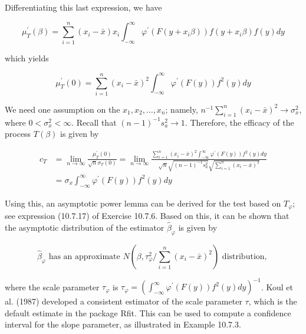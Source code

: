 Differentiating this last expression, we have

$$
\mu_{T}^{\prime}(\beta)=\sum_{i=1}^{n}\left(x_{i}-\bar{x}\right) x_{i} \int_{-\infty}^{\infty} \varphi^{\prime}\left(F\left(y+x_{i} \beta\right)\right) f\left(y+x_{i} \beta\right) f(y) d y
$$

which yields


\begin{equation*}
\mu_{T}^{\prime}(0)=\sum_{i=1}^{n}\left(x_{i}-\bar{x}\right)^{2} \int_{-\infty}^{\infty} \varphi^{\prime}(F(y)) f^{2}(y) d y \tag{10.7.12}
\end{equation*}


We need one assumption on the $x_{1}, x_{2}, \ldots, x_{n}$; namely, $n^{-1} \sum_{i=1}^{n}\left(x_{i}-\bar{x}\right)^{2} \rightarrow \sigma_{x}^{2}$, where $0<\sigma_{x}^{2}<\infty$. Recall that $(n-1)^{-1} s_{a}^{2} \rightarrow 1$. Therefore, the efficacy of the process $T(\beta)$ is given by


\begin{align*}
c_{T} & =\lim _{n \rightarrow \infty} \frac{\mu_{T}^{\prime}(0)}{\sqrt{n} \sigma_{T}(0)}=\lim _{n \rightarrow \infty} \frac{\sum_{i=1}^{n}\left(x_{i}-\bar{x}\right)^{2} \int_{-\infty}^{\infty} \varphi^{\prime}(F(y)) f^{2}(y) d y}{\sqrt{n} \sqrt{(n-1)^{-1} s_{a}^{2}} \sqrt{\sum_{i=1}^{n}\left(x_{i}-\bar{x}\right)^{2}}} \\
& =\sigma_{x} \int_{-\infty}^{\infty} \varphi^{\prime}(F(y)) f^{2}(y) d y \tag{10.7.13}
\end{align*}


Using this, an asymptotic power lemma can be derived for the test based on $T_{\varphi}$; see expression (10.7.17) of Exercise 10.7.6. Based on this, it can be shown that the asymptotic distribution of the estimator $\widehat{\beta}_{\varphi}$ is given by


\begin{equation*}
\widehat{\beta}_{\varphi} \text { has an approximate } N\left(\beta, \tau_{\varphi}^{2} / \sum_{i=1}^{n}\left(x_{i}-\bar{x}\right)^{2}\right) \text { distribution, } \tag{10.7.14}
\end{equation*}


where the scale parameter $\tau_{\varphi}$ is $\tau_{\varphi}=\left(\int_{-\infty}^{\infty} \varphi^{\prime}(F(y)) f^{2}(y) d y\right)^{-1}$. Koul et al. (1987) developed a consistent estimator of the scale parameter $\tau$, which is the default estimate in the package Rfit. This can be used to compute a confidence interval for the slope parameter, as illustrated in Example 10.7.3.

